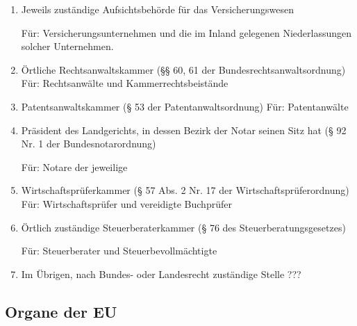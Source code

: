 \documentclass{article}
\begin{document}
\begin{enumerate}
                \item Jeweils zuständige Aufsichtsbehörde für das Versicherungswesen

                    Für: Versicherungsunternehmen und die im Inland gelegenen Niederlassungen solcher Unternehmen.

                \item Örtliche Rechtsanwaltskammer (§§ 60, 61 der Bundesrechtsanwaltsordnung)
                    Für: Rechtsanwälte und Kammerrechtsbeistände

                \item  Patentsanwaltskammer (§ 53 der Patentanwaltsordnung)
                    Für: Patentanwälte

                \item Präsident des Landgerichts, in dessen Bezirk der Notar seinen Sitz hat (§ 92 Nr. 1 der Bundesnotarordnung)

                    Für: Notare der jeweilige 

                \item Wirtschaftsprüferkammer (§ 57 Abs. 2 Nr. 17 der Wirtschaftsprüferordnung)
                Für: Wirtschaftsprüfer und vereidigte Buchprüfer

                \item Örtlich zuständige Steuerberaterkammer (§ 76 des Steuerberatungsgesetzes)

                    Für: Steuerberater und Steuerbevollmächtigte

                \item Im Übrigen, nach Bundes- oder Landesrecht zuständige Stelle ???

            \end{enumerate}

        \subsection[Organe EU]{Organe der EU}
\end{document}
